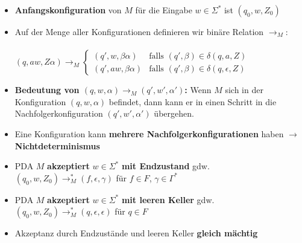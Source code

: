\documentclass[ieeetran]{article}
\begin{document}
\begin{itemize}
\item \textbf{Anfangskonfiguration} von $M$ für die Eingabe $w \in \Sigma^*$ ist $(q_0, w, Z_0)$

\item Auf der Menge aller Konfigurationen definieren wir binäre Relation $\rightarrow_M$:
	\\ \\ \begin{math}
		(q,aw,Z\alpha) \rightarrow_M \left\{
			\begin{array}{ll}
				(q',w,\beta \alpha) & \mbox{falls $(q', \beta) \in \delta(q, a, Z)$}\\
				(q', aw, \beta \alpha) & \mbox{falls $(q', \beta) \in \delta(q, \epsilon, Z)$}
		\end{array}
		\right.
	\end{math}

\item \textbf{Bedeutung von $(q, w, \alpha) \rightarrow_M (q', w',\alpha')$:} Wenn $M$ sich in der Konfiguration $(q, w, \alpha)$ befindet, dann kann er in einen Schritt in die Nachfolgerkonfiguration $(q', w',\alpha')$ übergehen.
\item Eine Konfiguration kann \textbf{mehrere Nachfolgerkonfigurationen} haben $\rightarrow$ \textbf{Nichtdeterminismus}

\item PDA $M$ \textbf{akzeptiert} $w \in \Sigma^*$ \textbf{mit Endzustand} gdw.\ $(q_0, w, Z_0) \rightarrow_M^* (f, \epsilon, \gamma)$ für $f \in F$, $\gamma \in \Gamma^*$

\item PDA $M$ \textbf{akzeptiert} $w \in \Sigma^*$ \textbf{mit leeren Keller} gdw.\ $(q_0, w, Z_0) \rightarrow_M^* (q, \epsilon, \epsilon)$ für $q \in F$
\item Akzeptanz durch Endzustände und leeren Keller \textbf{gleich mächtig}
	
\end{itemize}
\end{document}
